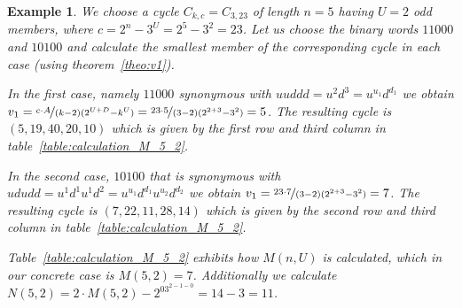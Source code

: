 \documentclass[12pt]{amsart}
\newtheorem{example}[theorem]{Example}
\theoremstyle{definition}
\begin{document}
\begin{example}
\label{ex:M_N}
We choose a cycle $C_{k,c}=C_{3,23}$ of length $n=5$ having $U=2$ odd members, where $c=2^n-3^U=2^5-3^2=23$. Let us choose the binary words $11000$ and $10100$ and calculate the smallest member of the corresponding cycle in each case (using theorem~\ref{theo:v1}).

In the first case, namely $11000$ synonymous with $uuddd=u^2d^3=u^{u_1}d^{d_1}$ we obtain $v_1=\nicefrac{c\cdot A}{(k-2)(2^{U+D}-k^U)}=\nicefrac{23\cdot 5}{(3-2)(2^{2+3}-3^2)}=5$. The resulting cycle is $(5,19,40,20,10)$ which is given by the first row and third column in table~\ref{table:calculation_M_5_2}.

In the second case, $10100$ that is synonymous with $ududd=u^1d^1u^1d^2=u^{u_1}d^{d_1}u^{u_2}d^{d_2}$ we obtain $v_1=\nicefrac{23\cdot 7}{(3-2)(2^{2+3}-3^2)}=7$. The resulting cycle is $(7,22,11,28,14)$ which is given by the second row and third column in table~\ref{table:calculation_M_5_2}.

Table~\ref{table:calculation_M_5_2} exhibits how $M(n,U)$ is calculated, which in our concrete case is $M(5,2)=7$. Additionally we calculate $N(5,2)=2\cdot M(5,2)-2^03^{2-1-0}=14-3=11$.
\end{example}
\end{document}
